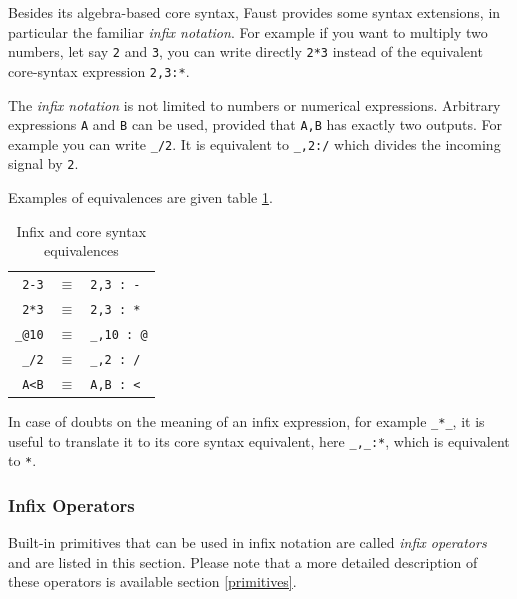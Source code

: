 Besides its algebra-based core syntax, Faust provides some syntax extensions, in particular the familiar \emph{infix notation}. For example if you want to multiply two numbers, let say \lstinline'2' and \lstinline'3', you can write directly \lstinline'2*3' instead of the equivalent core-syntax expression \lstinline'2,3:*'.

The \emph{infix notation} is not limited to numbers or numerical expressions. Arbitrary expressions \lstinline'A' and \lstinline'B' can be used, provided that \lstinline'A,B' has exactly two outputs. For example you can write \lstinline'_/2'. It is equivalent to \lstinline'_,2:/' which divides the incoming signal by \lstinline'2'. 

Examples of equivalences are given table \ref{tab:infixrules}.

\begin{table}[h]
	\begin{center}
	\begin{tabular}{|rcl|}
	\hline
	\lstinline'2-3' & $\equiv$ & \lstinline'2,3 : -'\\
	\lstinline'2*3' & $\equiv$ & \lstinline'2,3 : *'\\
	\lstinline'_@10' & $\equiv$ & \lstinline'_,10 : @'\\
	\lstinline'_/2' & $\equiv$ & \lstinline'_,2 : /'\\
	\lstinline'A<B' & $\equiv$ & \lstinline'A,B : <'\\
	\hline
	\end{tabular}
	\end{center}
	\caption{Infix and core syntax equivalences}
	\label{tab:infixrules}
\end{table}

In case of doubts on the meaning of an infix expression, for example \lstinline'_*_', it is useful to translate it to its core syntax equivalent, here \lstinline'_,_:*', which is equivalent to \lstinline'*'.
	
\subsubsection{Infix Operators}

Built-in primitives that can be used in infix notation are called \emph{infix operators} and are listed in this section. Please note that a more detailed description of these operators is available section \ref{primitives}. 


